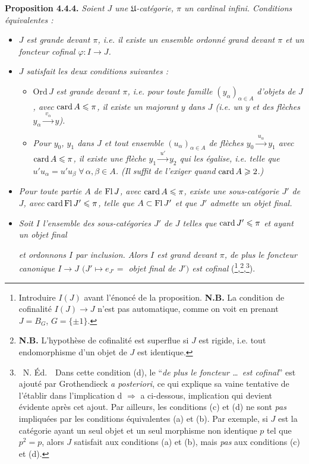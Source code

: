 \textbf{Proposition 4.4.4.} \textit{Soient $J$ une $\mathfrak{U}$-catégorie, $\pi$ un cardinal infini. Conditions équivalentes :}
\begin{itemize}[leftmargin=4em]
\item[\textit{a)}] \textit{$J$ est grande devant $\pi$, i.e. il existe un ensemble ordonné grand devant $\pi$ et un foncteur cofinal $\varphi : I \longrightarrow J$.}
\item[\textit{b)}] \textit{$J$ satisfait les deux conditions suivantes :}
\begin{itemize}[leftmargin=4em]
\item[$\mathrm{PF}_{\pi}\,1$] $\mathrm{Ord}\,J$ \textit{est grande devant $\pi$, i.e. pour toute famille $(y_\alpha)_{\alpha\in A}$ d'objets de $J$, avec} $\operatorname{card} A \leqslant \pi$\textit{, il existe un majorant $y$ dans $J$ (i.e. un $y$ et des flèches $y_\alpha \xrightarrow{\;v_\alpha\;} y$).}
\item[$\mathrm{PF}_{\pi}\,2$] \textit{Pour $y_0$, $y_1$ dans $J$ et tout ensemble $(u_\alpha)_{\alpha\in A}$ de flèches $y_0 \xrightarrow{\;u_\alpha\;} y_1$ avec} $\operatorname{card} A \leqslant \pi$\textit{, il existe une flèche $y_1 \xrightarrow{\;u'\;} y_2$ qui les égalise, i.e. telle que $u'u_\alpha = u'u_\beta \;\forall\, \alpha,\beta \in A$. (Il suffit de l'exiger quand} $\operatorname{card} A \geqslant 2$.\textit{)}
\end{itemize}
\item[\textit{c)}] \textit{Pour toute partie $A$ de} $\operatorname{Fl} J$\textit{, avec} $\operatorname{card} A \leqslant \pi$\textit{, existe une sous-catégorie $J'$ de $J$, avec} $\operatorname{card}\operatorname{Fl} J' \leqslant \pi$\textit{, telle que $A \subset \operatorname{Fl} J'$ et que $J'$ admette un objet final.}
\item[\textit{d)}] \textit{Soit $I$ l'ensemble des sous-catégories $J'$ de $J$ telles que} $\operatorname{card} J' \leqslant \pi$ \textit{et ayant un objet final}

\textit{et ordonnons $I$ par inclusion. Alors $I$ est grand devant $\pi$, de plus le foncteur canonique $I \longrightarrow J$ $(J' \longmapsto e_{J'} =$ objet final de $J')$ est cofinal} (\footnote{Introduire $I(J)$ avant l'énoncé de la proposition. \textbf{N.B.} La condition de cofinalité $I(J) \longrightarrow J$ n'est pas automatique, comme on voit en prenant $J = B_G$, $G = \{\pm 1\}$.},\footnote{\textbf{N.B.} L'hypothèse de cofinalité est superflue si $J$ est rigide, i.e. tout endomorphisme d'un objet de $J$ est identique.},\footnote{\ N. Éd.\ \ Dans cette condition (d), le “\textit{de plus le foncteur \dots\ est cofinal}” est ajouté par Grothendieck \textit{a posteriori}, ce qui explique sa vaine tentative de l'établir dans l'implication d $\Longrightarrow$ a ci-dessous, implication qui devient évidente après cet ajout. Par ailleurs, les conditions (c) et (d) ne sont \textit{pas} impliquées par les conditions équivalentes (a) et (b). Par exemple, si $J$ est la catégorie ayant un seul objet et un seul morphisme non identique $p$ tel que $p^2 = p$, alors $J$ satisfait aux conditions (a) et (b), mais \textit{pas} aux conditions (c) et (d).}).
\end{itemize}
